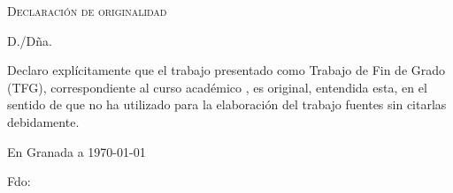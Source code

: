 %

\thispagestyle{empty}

\hfill\vfill

\textsc{Declaración de originalidad}\\\bigskip

D./Dña. \miNombre \\\medskip

Declaro explícitamente que el trabajo presentado como Trabajo de Fin de Grado (TFG), correspondiente al curso académico \miCurso, es original, entendida esta, en el sentido de que no ha utilizado para la elaboración del trabajo fuentes sin citarlas debidamente.
\medskip

En Granada a \today 
\begin{flushleft} 
Fdo: \miNombre 

\end{flushleft}

\vfill

\cleardoublepage
\endinput
